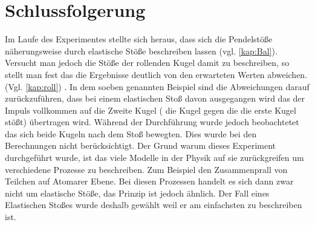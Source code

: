 
\section{Schlussfolgerung}
Im Laufe des Experimentes stellte sich heraus, dass sich die Pendelstöße näherungsweise durch elastische Stöße beschreiben lassen (vgl. \cref{kap:Bal}). Versucht man jedoch die Stöße der rollenden Kugel damit zu beschreiben, so stellt man fest das die Ergebnisse deutlich von den erwarteten Werten abweichen. (Vgl. \cref{kap:roll}) .
In dem soeben genannten Beispiel sind die Abweichungen darauf zurückzuführen, dass bei einem elastischen Stoß davon ausgegangen wird das der Impuls vollkommen auf die Zweite Kugel ( die Kugel gegen die die erste Kugel stößt) übertragen wird. Während der Durchführung wurde jedoch beobachtetet das sich beide Kugeln nach dem Stoß bewegten. Dies wurde bei den Berechnungen nicht berücksichtigt.
Der Grund warum dieses Experiment durchgeführt wurde, ist das viele Modelle in der Physik auf sie zurückgreifen um verschiedene Prozesse zu beschreiben. Zum Beispiel den Zusammenprall von Teilchen auf Atomarer Ebene. Bei diesen Prozessen handelt es sich dann zwar nicht um elastische Stöße, das Prinzip ist jedoch ähnlich. Der Fall eines Elastischen Stoßes wurde deshalb gewählt weil er am einfachsten zu beschreiben ist.














